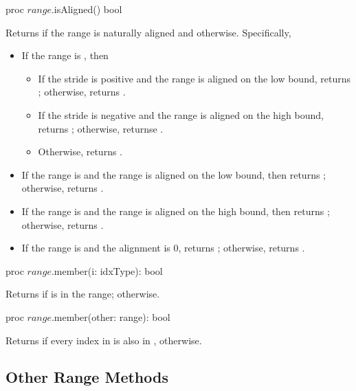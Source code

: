 \begin{protohead}
proc $range$.isAligned() bool
\end{protohead}
\begin{protobody}
Returns  if the range is naturally aligned and  otherwise.
Specifically,
\begin{itemize}
\item If the range is , then
\begin{itemize}
\item If the stride is positive and the range is aligned on the low bound,
returns ; otherwise, returns .
\item If the stride is negative and the range is aligned on the high bound,
returns ; otherwise, returnse .
\item Otherwise, returns .
\end{itemize}
\item If the range is  and the range is aligned on the low
bound, then returns ; otherwise, returns .
\item If the range is  and the range is aligned on the high
bound, then returns ; otherwise, returns .
\item If the range is  and the alignment is 0, returns ;
otherwise, returns .
\end{itemize}
\end{protobody}

\begin{protohead}
proc $range$.member(i: idxType): bool
\end{protohead}
\begin{protobody}
Returns  if  is in the range;  otherwise.
\end{protobody}

\begin{protohead}
proc $range$.member(other: range): bool
\end{protohead}
\begin{protobody}
Returns  if every index in  is also in ,  otherwise.
\end{protobody}

\subsection{Other Range Methods}

